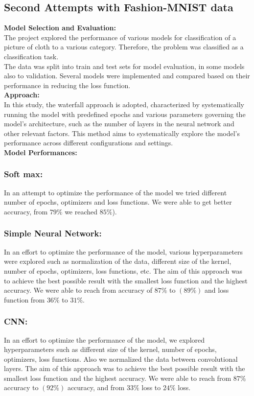 \documentclass{article}
\begin{document}
\subsection{Second Attempts with Fashion-MNIST data}
\textbf{Model Selection and Evaluation:}\\
The project explored the performance of various models for classification of a picture of cloth to a various category. Therefore, the problem was classified as a classification task.\\
The data was split into train and test sets for model evaluation, in some models also to validation. Several models were implemented and compared based on their performance in reducing the loss function.\\\newline
\textbf{Approach:}\\
In this study, the waterfall approach is adopted, characterized by systematically running the model with predefined epochs and various parameters governing the model's architecture, such as the number of layers in the neural network and other relevant factors. This method aims to systematically explore the model's performance across different configurations and settings.\\\newline
\textbf{Model Performances:}
\subsubsection{Soft max:}
In an attempt to optimize the performance of the model we tried different number of epochs, optimizers and loss functions. We were able to get better accuracy, from ${79\%}$ we reached ${85\%}$).\\

\subsubsection{Simple Neural Network:}
In an effort to optimize the performance of the model, various hyperparameters were explored such as normalization of the data, different size of the kernel, number of epochs, optimizers, loss functions, etc.
The aim of this approach was to achieve the best possible result with the smallest loss function and the highest accuracy. We were able to reach from accuracy of ${87\%}$ to $(89\%)$ and loss function from ${36\%}$ to ${31\%}$.\\

\subsubsection{CNN:}
In an effort to optimize the performance of the model, we explored hyperparameters such as different size of the kernel, number of epochs, optimizers, loss functions. Also  we normalized the data between convolutional layers.
The aim of this approach was to achieve the best possible result with the smallest loss function and the highest accuracy. We were able to reach from ${87\%}$ accuracy to $(92\%)$ accuracy, and from ${33\%}$ loss to ${24\%}$ loss.\\
\end{document}
